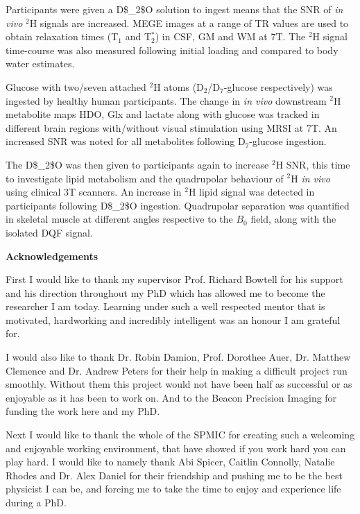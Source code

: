 \documentclass[12pt,english]{report}
\begin{document}
Participants were given a \ac{D$_2$O} solution to ingest means that the \ac{SNR} of \textit{in vivo} $^2$H signals are increased. \ac{MEGE} images at a range of \ac{TR} values are used to obtain relaxation times (T$_1$ and T$_2^*$) in \ac{CSF}, \ac{GM} and \ac{WM} at 7T. The $^2$H signal time-course was also measured following initial loading and compared to body water estimates.

Glucose with two/seven attached $^2$H atoms (D$_2$/D$_7$-glucose respectively) was ingested by healthy human participants. The change in \textit{in vivo} downstream $^2$H metabolite maps \ac{HDO}, Glx and lactate along with glucose was tracked in different brain regions with/without visual stimulation using \ac{MRSI} at 7T. An increased \ac{SNR} was noted for all metabolites following D$_7$-glucose ingestion.

The \ac{D$_2$O} was then given to participants again to increase $^2$H \ac{SNR}, this time to investigate lipid metabolism and the quadrupolar behaviour of $^2$H \textit{in vivo} using clinical 3T scanners. An increase in $^2$H lipid signal was detected in participants following \ac{D$_2$O} ingestion. Quadrupolar separation was quantified in skeletal muscle at different angles respective to the $B_0$ field, along with the isolated \ac{DQF} signal.
\vspace*{\fill}

\newpage
\vspace*{\fill}

\newpage
\thispagestyle{plain}
\begin{center}
    \textbf{Acknowledgements}
\end{center}
First I would like to thank my supervisor Prof. Richard Bowtell for his support and his direction throughout my PhD which has allowed me to become the researcher I am today. Learning under such a well respected mentor that is motivated, hardworking and incredibly intelligent was an honour I am grateful for. 

I would also like to thank Dr. Robin Damion, Prof. Dorothee Auer, Dr. Matthew Clemence and Dr. Andrew Peters for their help in making a difficult project run smoothly. Without them this project would not have been half as successful or as enjoyable as it has been to work on. And to the Beacon Precision Imaging for funding the work here and my PhD.

Next I would like to thank the whole of the SPMIC for creating such a welcoming and enjoyable working environment, that have showed if you work hard you can play hard. I would like to namely thank Abi Spicer, Caitlin Connolly, Natalie Rhodes and Dr. Alex Daniel for their friendship and pushing me to be the best physicist I can be, and forcing me to take the time to enjoy and experience life during a PhD.
\end{document}
